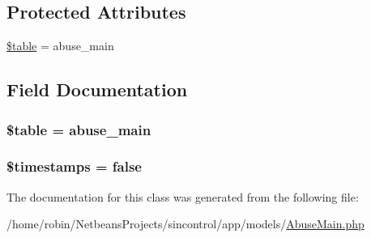 \subsection*{Protected Attributes}
\begin{DoxyCompactItemize}
\item 
\hyperlink{class_abuse_main_ae8876a14058f368335baccf35af4a22b}{\$table} = \textquotesingle{}abuse\+\_\+main\textquotesingle{}
\end{DoxyCompactItemize}


\subsection{Field Documentation}
\hypertarget{class_abuse_main_ae8876a14058f368335baccf35af4a22b}{}
\subsubsection[{\$table}]{\setlength{\rightskip}{0pt plus 5cm}\$table = \textquotesingle{}abuse\+\_\+main\textquotesingle{}\hspace{0.3cm}{\ttfamily [protected]}}\label{class_abuse_main_ae8876a14058f368335baccf35af4a22b}
\hypertarget{class_abuse_main_a51267c24c8fae742ed8f9be0ba6085ee}{}
\subsubsection[{\$timestamps}]{\setlength{\rightskip}{0pt plus 5cm}\$timestamps = false}\label{class_abuse_main_a51267c24c8fae742ed8f9be0ba6085ee}


The documentation for this class was generated from the following file\+:\begin{DoxyCompactItemize}
\item 
/home/robin/\+Netbeans\+Projects/sincontrol/app/models/\hyperlink{_abuse_main_8php}{Abuse\+Main.\+php}\end{DoxyCompactItemize}
